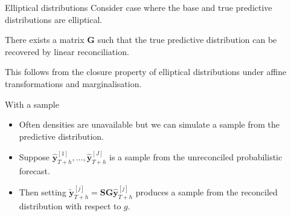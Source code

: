 \documentclass{beamer}
\begin{document}
  \begin{frame}{Elliptical distributions}
  	Consider case where the base and true predictive distributions are elliptical.
  	\begin{theorem}
  		There exists a matrix $\bm{G}$ such that the true predictive distribution can be recovered by linear reconciliation.
  	\end{theorem}
    This follows from the closure property of elliptical distributions under affine transformations and marginalisation.  
  \end{frame}
  \begin{frame}{With a sample}
  	\begin{itemize}
  		\item Often densities are unavailable but we can simulate a sample from the predictive distribution.
  		\pause
  		\item Suppose $\bm{\hat{y}}_{T+h}^{[1]},\ldots,\bm{\hat{y}}_{T+h}^{[J]}$ is a sample from the unreconciled probabilistic forecast.
  		\pause
  		\item Then setting $\tilde{\bm y}_{T+h}^{[j]}=\bm{S}\bm{G}\hat{\bm y}_{T+h}^{[j]}$ produces a sample from the reconciled distribution with respect to $g$.
  	\end{itemize}
  \end{frame}
\end{document}
